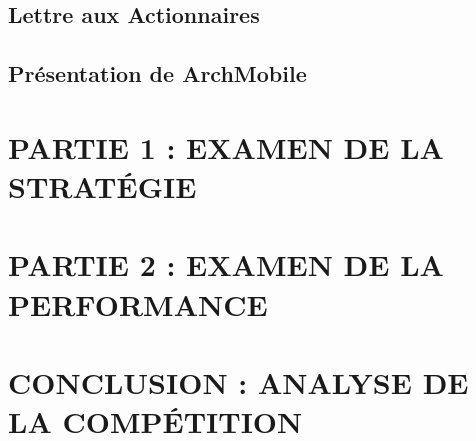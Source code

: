 \documentclass[a4paper, 12pt]{article}
\begin{document}
\subsection{Lettre aux Actionnaires}

\subsection{Présentation de ArchMobile}


\pagebreak

\section{PARTIE 1 : EXAMEN DE LA STRATÉGIE}


\pagebreak

\section{PARTIE 2 : EXAMEN DE LA PERFORMANCE}


\pagebreak
\section{CONCLUSION : ANALYSE DE LA COMPÉTITION}

\end{document}
